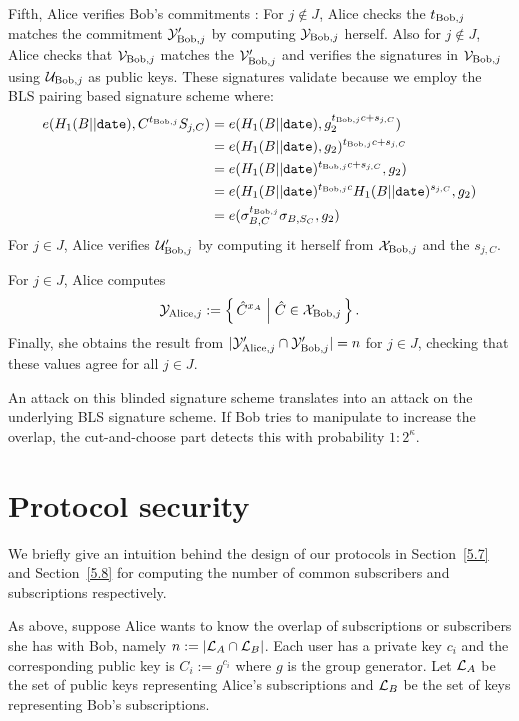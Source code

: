 \documentclass{article}
\begin{document}
Fifth, Alice verifies Bob's commitments :
For $j \notin J$, Alice checks the $t_{{\textrm{Bob}},j}$ matches the
 commitment ${\cal Y}'_{{\textrm{Bob}},j}$ by computing ${\cal Y}_{{\textrm{Bob}},j}$ herself.
Also for $j \notin J$, Alice checks that ${\cal V}_{{\textrm{Bob}},j}$
 matches the ${\cal V}'_{{\textrm{Bob}},j}$ and verifies the signatures in
 ${\cal V}_{{\textrm{Bob}},j}$ using ${\cal U}_{{\textrm{Bob}},j}$ as public keys.
These signatures validate because we employ the BLS pairing based
signature scheme where:
\begin{align*}
 e( H_1(B||\texttt{date}), C^{t_{{\textrm{Bob}},j}} S_{j,C} )
 &= e (H_1(B||\texttt{date}), g_2^{t_{{\textrm{Bob}},j} c + s_{j,C}}) \\
 &= e( H_1(B||\texttt{date}), g_2 )^{t_{{\textrm{Bob}},j} c + s_{j,C}} \\
 &= e( H_1(B||\texttt{date})^{t_{{\textrm{Bob}},j}c + s_{j,C}}, g_2 ) \\
 &= e( H_1(B||\texttt{date})^{t_{{\textrm{Bob}},j}c} H_1(B||\texttt{date})^{s_{j,C}}, g_2 ) \\
 &= e( \sigma_{B,C}^{t_{{\textrm{Bob}},j}} \sigma_{B,S_C}, g_2 )
\end{align*}
For $j \in J$, Alice verifies ${\cal U}'_{{\textrm{Bob}},j}$ by computing it
 herself from ${\cal X}_{{\textrm{Bob}},j}$ and the $s_{j,C}$.

For $j\in J$, Alice computes
\begin{equation}
  {\cal Y}_{\Alice,j} :=
  \Setst{ \hat{C}^{x_A}}{ \hat{C} \in {\cal X}_{\Bob,j} }
  \mathperiod
\end{equation}
Finally, she obtains the result from
$|{\cal Y}'_{{\textrm{Alice}},j} \cap {\cal Y}'_{{\textrm{Bob}},j}| = n$ for $j \in J$,
checking that these values agree for all $j \in J$.

An attack on this blinded signature scheme translates into an attack
on the underlying BLS signature scheme.  If Bob tries to manipulate to
increase the overlap, the cut-and-choose part detects this with
probability $1:2^\kappa$.


\section{Protocol security}

We briefly give an intuition behind the design of our protocols
in Section~\ref{5.7} and Section~\ref{5.8} for computing
the number of common subscribers and subscriptions respectively.

As above, suppose Alice wants to know the overlap of subscriptions or
subscribers she has with Bob, namely $n := |{\cal L}_A \cap {\cal L}_B|$.
Each user has a private key $c_i$ and
the corresponding public key is $C_i := g^{c_i}$ where
 $g$ is the group generator.
Let ${\cal L}_A$ be the set of public keys representing
Alice's subscriptions and ${\cal L}_B$ be the set of keys representing
Bob's subscriptions.
\end{document}
